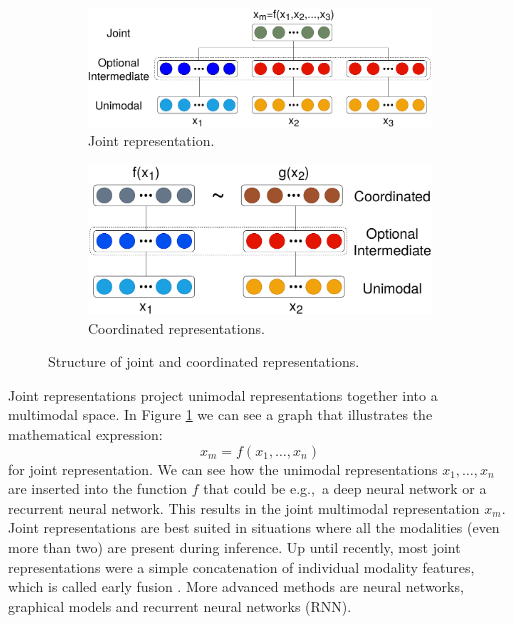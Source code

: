 \documentclass{article}
\begin{document}
\begin{figure}[H]
	\centering
	\begin{subfigure}[b]{0.54\linewidth}
		\includegraphics[width=\linewidth]{joint_reps.pdf}
		\caption{Joint representation.}
		\label{fig:reps1}	
	\end{subfigure}
	\begin{subfigure}[b]{0.43\linewidth}
		\includegraphics[width=\linewidth]{coordinated_reps.pdf}
		\caption{Coordinated representations.}
		\label{fig:reps2}	
	\end{subfigure}
	\caption{Structure of joint and coordinated representations.}
	\label{fig:reps}
\end{figure}

Joint representations project unimodal representations together into a multimodal space. In Figure \ref{fig:reps1} we can see a graph that illustrates the mathematical expression:
\begin{equation}
x_m = f(x_1, \dots , x_n)
\end{equation}
for joint representation. We can see how the unimodal representations $x_1, \dots , x_n$ are inserted into the function $f$ that could be e.g.,\ a deep neural network or a recurrent neural network. This results in the joint multimodal representation $x_m$.
Joint representations are best suited in situations where all the modalities (even more than two) are present during inference. Up until recently, most joint representations were a simple concatenation of individual modality features, which is called early fusion \citep{dmello2015review}. More advanced methods are neural networks, graphical models and recurrent neural networks (RNN).
\end{document}
